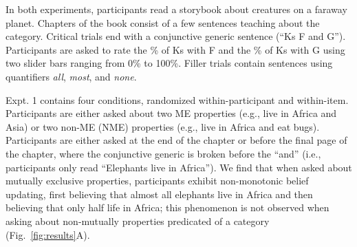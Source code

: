 \documentclass[letterpaper, 12pt]{article}
\begin{document}
In both experiments, participants read a storybook about creatures on a faraway planet. Chapters of the book consist of a few sentences teaching about the category. Critical trials end with a conjunctive generic sentence (``Ks F and G''). Participants are asked to rate the \% of Ks with F and the \% of Ks with G using two slider bars ranging from 0\% to 100\%. Filler trials contain sentences using quantifiers \emph{all}, \emph{most}, and \emph{none}.%
%

Expt. 1 contains four conditions, randomized within-participant and within-item. Participants are either asked about two ME properties (e.g., live in Africa and Asia) or two non-ME (NME) properties (e.g., live in Africa and eat bugs). Participants are either asked at the end of the chapter or before the final page of the chapter, where the conjunctive generic is broken before the ``and'' (i.e., participants only read ``Elephants live in Africa''). We find that when asked about mutually exclusive properties, participants exhibit non-monotonic belief updating, first believing that almost all elephants live in Africa and then believing that only half life in Africa; this phenomenon is not observed when asking about non-mutually properties predicated of a category (Fig.~\ref{fig:results}A).

\end{document}
